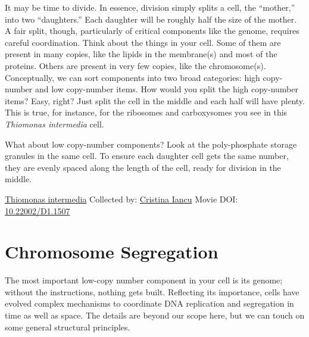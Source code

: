 \documentclass[]{tufte-book}
\begin{document}
It may be time to divide. In essence, division simply splits a cell, the ``mother,'' into two ``daughters.'' Each daughter will be roughly half the size of the mother. A fair split, though, particularly of critical components like the genome, requires careful coordination. Think about the things in your cell. Some of them are present in many copies, like the lipids in the membrane(s) and most of the proteins. Others are present in very few copies, like the chromosome(s). Conceptually, we can sort components into two broad categories: high copy-number and low copy-number items. How would you split the high copy-number items? Easy, right? Just split the cell in the middle and each half will have plenty. This is true, for instance, for the ribosomes and carboxysomes you see in this \emph{Thiomonas intermedia} cell.

What about low copy-number components? Look at the poly-phosphate storage granules in the same cell. To ensure each daughter cell gets the same number, they are evenly spaced along the length of the cell, ready for division in the middle.



\hypertarget{htmlwidget-9fa5ac7fe4b5a7f790c6}{}

\label{fig:5-1}\protect\hyperlink{tree}{Thiomonas intermedia} Collected by: \protect\hyperlink{cristina_iancu}{Cristina Iancu} Movie DOI: \href{https://doi.org/10.22002/D1.1507}{10.22002/D1.1507}

\hypertarget{chromosome-segregation}{%
\section{Chromosome Segregation}\label{chromosome-segregation}}

The most important low-copy number component in your cell is its genome; without the instructions, nothing gets built. Reflecting its importance, cells have evolved complex mechanisms to coordinate DNA replication and segregation in time as well as space. The details are beyond our scope here, but we can touch on some general structural principles.
\end{document}
